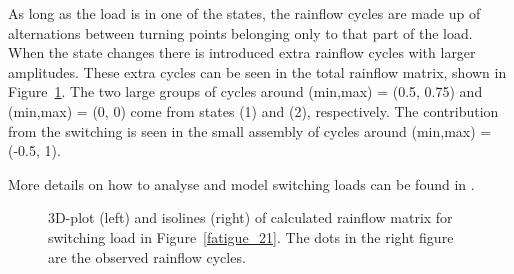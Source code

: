 As long as the load is in one of the states, the rainflow cycles are
made up of alternations between turning points belonging only
to that part of the load. When the state changes there is introduced
extra rainflow cycles with larger amplitudes. These extra cycles
can be seen in the total rainflow matrix, shown in Figure~\ref{fatigue_22}.
The two large groups of cycles around (min,max) = (0.5, 0.75) and
(min,max) = (0, 0) come from states (1) and (2), respectively.
The contribution from the switching is seen in the small
assembly of cycles around (min,max) = (-0.5, 1).

More details on how to analyse and model switching loads can be found in
\cite{Johannesson1997Matlab}.%

\begin{figure}[tbh]
%
\hfill
{}
\vspace{-3mm}
\caption[3D-plot and isolines of calculated rainflow matrix]
{3D-plot (left) and isolines (right) of calculated rainflow matrix
for switching load in Figure~\ref{fatigue_21}. The dots in the right figure
are the observed rainflow cycles.}
\label{fatigue_22}
\end{figure}

%


